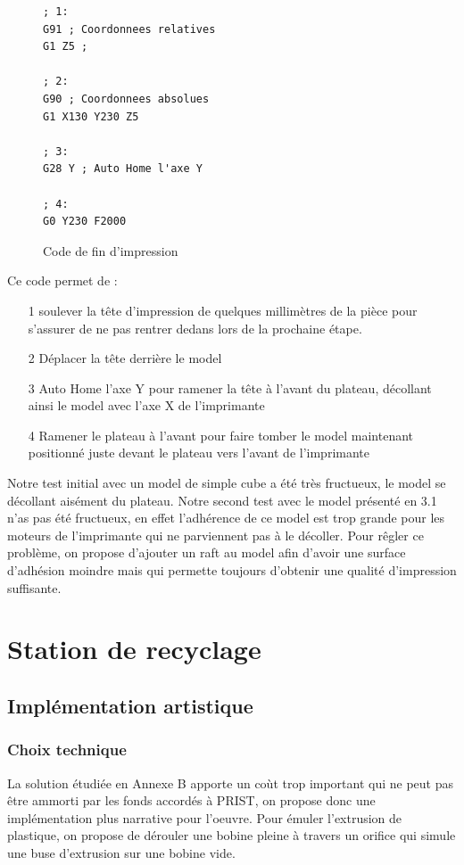 \documentclass[oneside,a4paper,12pt]{article}
\begin{document}
	\begin{figure}[h]
		\centering
		\begin{lstlisting}
; 1:
G91 ; Coordonnees relatives
G1 Z5 ; 

; 2:
G90 ; Coordonnees absolues
G1 X130 Y230 Z5

; 3:
G28 Y ; Auto Home l'axe Y

; 4:
G0 Y230 F2000
		\end{lstlisting}
		\caption{Code de fin d'impression}
	\end{figure}
	
	Ce code permet de :
	\begin{itemize}
		\item[1] soulever la tête d'impression de quelques millimètres de la pièce pour s'assurer de ne pas rentrer dedans lors de la prochaine étape.
		\item[2] Déplacer la tête derrière le model 
		\item[3] Auto Home l'axe Y pour ramener la tête à l'avant du plateau, décollant ainsi le model avec l'axe X de l'imprimante
		\item[4] Ramener le plateau à l'avant pour faire tomber le model maintenant positionné juste devant le plateau vers l'avant de l'imprimante 
	\end{itemize}
	
	Notre test initial avec un model de simple cube a été très fructueux, le model se décollant aisément du plateau. Notre second test avec le model présenté en 3.1 n'as pas été fructueux, en effet l'adhérence de ce model est trop grande pour les moteurs de l'imprimante qui ne parviennent pas à le décoller.
	Pour rêgler ce problème, on propose d'ajouter un raft au model afin d'avoir une surface d'adhésion moindre mais qui permette toujours d'obtenir une qualité d'impression suffisante.
	
	\section{Station de recyclage}
	
	\subsection{Implémentation artistique}
	
	\subsubsection{Choix technique}
	La solution étudiée en Annexe B apporte un co\`ut trop important qui ne peut pas être ammorti par les fonds accordés à PRIST, on propose donc une implémentation plus narrative pour l'oeuvre.
	Pour émuler l'extrusion de plastique, on propose de dérouler une bobine pleine à travers un orifice qui simule une buse d'extrusion sur une bobine vide.
	
\end{document}
